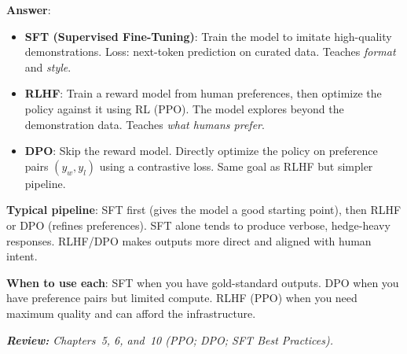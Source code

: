 \begin{questionbox}
\textbf{Answer}:

\begin{itemize}
  \item \textbf{SFT (Supervised Fine-Tuning)}: Train the model to imitate high-quality demonstrations. Loss: next-token prediction on curated data. Teaches \emph{format} and \emph{style}.
  \item \textbf{RLHF}: Train a reward model from human preferences, then optimize the policy against it using RL (PPO). The model explores beyond the demonstration data. Teaches \emph{what humans prefer}.
  \item \textbf{DPO}: Skip the reward model. Directly optimize the policy on preference pairs $(y_w, y_l)$ using a contrastive loss. Same goal as RLHF but simpler pipeline.
\end{itemize}

\textbf{Typical pipeline}: SFT first (gives the model a good starting point), then RLHF or DPO (refines preferences). SFT alone tends to produce verbose, hedge-heavy responses. RLHF/DPO makes outputs more direct and aligned with human intent.

\textbf{When to use each}: SFT when you have gold-standard outputs. DPO when you have preference pairs but limited compute. RLHF (PPO) when you need maximum quality and can afford the infrastructure.

\emph{\textbf{Review:} Chapters~5, 6, and~10 (PPO; DPO; SFT Best Practices).}
\end{questionbox}

